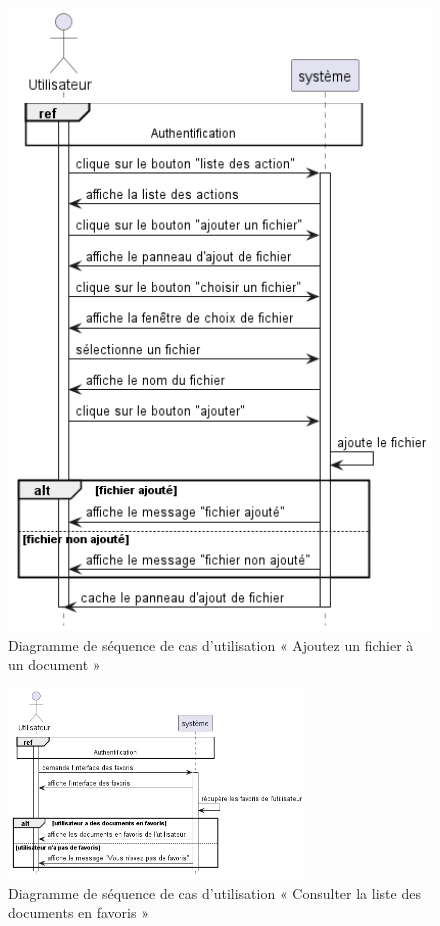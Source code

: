 \begin{figure}[H]
  \centering
  \includegraphics[width=1\textwidth]{out/diagrams/documents/add_file/add_file}
  \caption{Diagramme de séquence de cas d'utilisation « Ajoutez un fichier à un document  »}
  \label{fig:sequence_add_file}
\end{figure}
\begin{figure}[H]
  \centering
  \includegraphics[width=0.7\textwidth]{out/diagrams/documents/favoris/favorit_document}
  \caption{Diagramme de séquence de cas d'utilisation « Consulter la liste des documents en favoris  »}
  \label{fig:sequence_favorit_document}
\end{figure}

